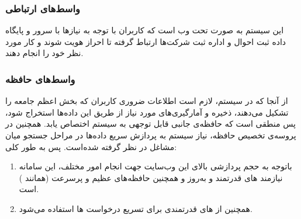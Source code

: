 \documentclass{report}
\begin{document}
				\subsubsection{واسط‌های ارتباطی}
					این سیستم به صورت تحت‌ وب است که کاربران با توجه به نیاز‌ها با سرور و پایگاه داده ثبت احوال و اداره ثبت شرکت‌ها ارتباط گرفته تا احراز هویت شوند و کار مورد نظر خود را انجام دهند.
					
				\subsubsection{واسط‌های حافظه}
					از آنجا که در سیستم، لازم است اطلاعات ضروری کاربران که بخش اعظم جامعه را تشکیل می‌دهند، ذخیره و آمارگیری‌های مورد نیاز از طریق این داده‌ها استخراج شود، پس منطقی است که حافظه‌ی جانبی قابل توجهی به سیستم اختصاص یابد. همچنین در 
					پروسه‌ی تخصیص حافظه، نیاز سیستم به پردازش سریع داده‌ها در مراحل جستجو میان مشاغل در نظر گرفته شده‌است. 
					پس به طور کلی:
					
					\begin{enumerate}
						\item 
						باتوجه به حجم پردازشی بالای این وب‌سایت جهت انجام امور مختلف، این سامانه نیازمند های قدرتمند و به‌روز و همچنین حافظه‌های عظیم و پرسرعت (همانند ) است.
						
						\item 
						همچنین از های قدرتمندی برای تسریع درخواست ها استفاده می‌شود.
					\end{enumerate}
\end{document}

